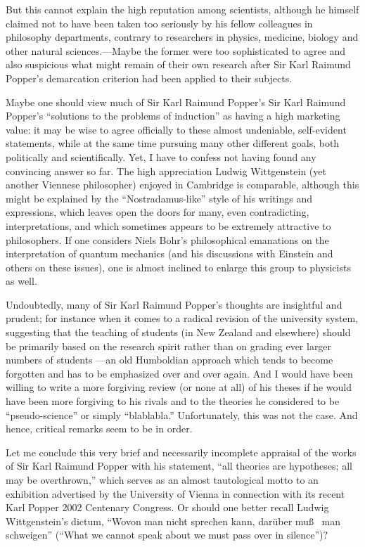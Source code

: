 But this cannot explain the high reputation among scientists, although
he himself claimed not to have been taken too seriously by his fellow
colleagues in philosophy departments, contrary to researchers in
physics, medicine, biology and other natural sciences.---Maybe the former were too
sophisticated to agree and also suspicious what might remain of their own
research after Sir Karl Raimund Popper's demarcation criterion
had been applied to their subjects.

Maybe one should view much of Sir Karl Raimund Popper's
Sir Karl Raimund Popper's ``solutions to the problems of induction''
as having a high marketing
value: it may be wise to agree officially to these almost undeniable,
self-evident statements, while at the same time pursuing many other
different goals, both politically and scientifically.
Yet, I have to confess not having found any convincing answer so far.
The high appreciation Ludwig Wittgenstein (yet another
Viennese philosopher) enjoyed in Cambridge is comparable, although this
might be explained by the ``Nostradamus-like'' style of his writings and
expressions, which leaves open the doors for many, even
contradicting, interpretations, and which sometimes appears to be
extremely attractive to philosophers.
If one considers Niels Bohr's philosophical emanations on the
interpretation of quantum mechanics (and his discussions with Einstein
and others on these issues), one is almost inclined to enlarge this
group to physicists as well.


Undoubtedly, many of  Sir Karl Raimund Popper's thoughts are insightful
and prudent; for instance when it comes to a radical revision
of the university system,
suggesting that the teaching of students (in New Zealand and elsewhere)
should be primarily based on the research spirit rather than on
grading ever larger numbers of
students \cite{aefppp}---an old Humboldian approach
which tends to become forgotten and has to be emphasized over and over again.
And I would have been willing to write
a more forgiving review (or none at all) of his theses
if he would have been more forgiving to his rivals and to the theories he
considered to be ``pseudo-science'' or simply ``blablabla.''
Unfortunately, this was not the case.
And hence, critical remarks seem to be in order.

Let me conclude this very brief and necessarily incomplete appraisal
of the works of Sir Karl Raimund Popper with his statement,
``all theories are hypotheses; all may be overthrown,'' which serves as
an almost tautological motto to an exhibition advertised by the University
of Vienna in connection with its recent Karl Popper 2002
Centenary Congress.
Or should one better recall Ludwig Wittgenstein's dictum, ``Wovon man
nicht sprechen kann, dar\"uber mu\ss~ man
schweigen'' (``What we cannot speak about we must
pass over in silence'')?



